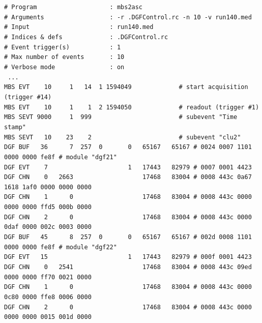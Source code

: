 \documentclass[10pt]{article}
\newenvironment{yellowboxed}
	{\begin{Sbox}\begin{minipage}[t]}
	{\end{minipage}\end{Sbox}\colorbox{yellow}{\TheSbox}}
\begin{document}
{\scriptsize
\begin{yellowboxed}{\linewidth}
\verb+# Program                    : mbs2asc+\\
\verb+# Arguments                  : -r .DGFControl.rc -n 10 -v run140.med+\\
\verb+# Input                      : run140.med+\\
\verb+# Indices & defs             : .DGFControl.rc+\\
\verb+# Event trigger(s)           : 1+\\
\verb+# Max number of events       : 10+\\
\verb+# Verbose mode               : on+\\
\verb+ ... +\\
\verb+MBS EVT    10     1   14 	1 1594049             # start acquisition (trigger #14)+\\
\verb+MBS EVT    10     1    1 	2 1594050             # readout (trigger #1)+\\
\verb+MBS SEVT 9000     1  999                        # subevent "Time stamp"+\\
\verb+MBS SEVT   10    23  	 2                        # subevent "clu2"+\\
\verb+DGF BUF   36      7  257  0       0   65167   65167 # 0024 0007 1101 0000 0000 fe8f # module "dgf21"+\\
\verb+DGF EVT    7                      1   17443   82979 # 0007 0001 4423+\\
\verb+DGF CHN    0   2663                   17468   83004 # 0008 443c 0a67 1618 1af0 0000 0000 0000+\\
\verb+DGF CHN    1      0                   17468   83004 # 0008 443c 0000 0000 0000 ffd5 000b 0000+\\
\verb+DGF CHN    2      0                   17468   83004 # 0008 443c 0000 0daf 0000 002c 0003 0000+\\
\verb+DGF BUF   45      8  257  0       0   65167   65167 # 002d 0008 1101 0000 0000 fe8f # module "dgf22"+\\
\verb+DGF EVT   15                      1   17443   82979 # 000f 0001 4423+\\
\verb+DGF CHN    0   2541                   17468   83004 # 0008 443c 09ed 0000 0000 ff70 0021 0000+\\
\verb+DGF CHN    1      0                   17468   83004 # 0008 443c 0000 0c80 0000 ffe8 0006 0000+\\
\verb+DGF CHN    2      0                   17468   83004 # 0008 443c 0000 0000 0000 0015 001d 0000+\\

\end{yellowboxed}}
\end{document}
